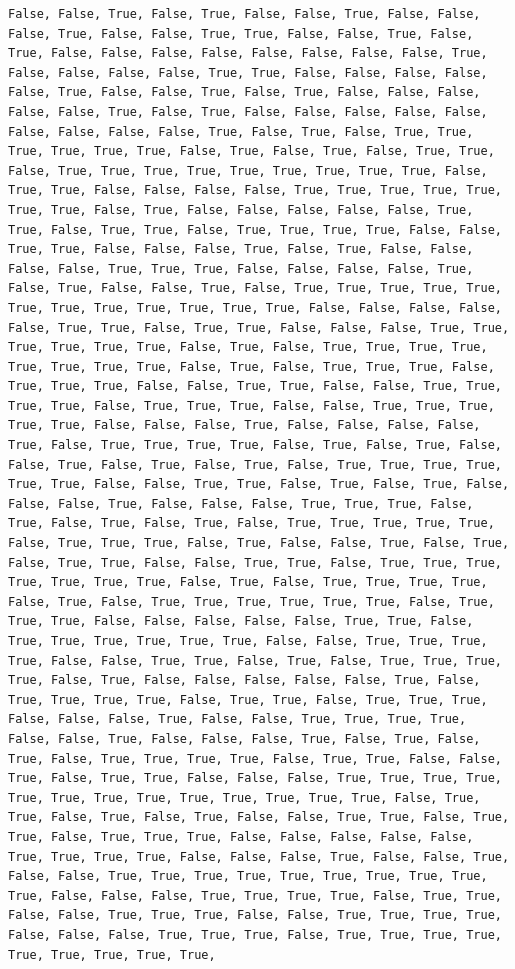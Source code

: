 \documentclass[
  letterpaper,
  DIV=11,
  numbers=noendperiod]{scrartcl}
\begin{document}
\begin{verbatim}
False, False, True, False, True, False, False, True, False, False, False, True, False, False, True, True, False, False, True, False, True, False, False, False, False, False, False, False, False, True, False, False, False, False, True, True, False, False, False, False, False, True, False, False, True, False, True, False, False, False, False, False, True, False, True, False, False, False, False, False, False, False, False, False, True, False, True, False, True, True, True, True, True, True, False, True, False, True, False, True, True, False, True, True, True, True, True, True, True, True, True, False, True, True, False, False, False, False, True, True, True, True, True, True, True, False, True, False, False, False, False, False, True, True, False, True, True, False, True, True, True, True, False, False, True, True, False, False, False, True, False, True, False, False, False, False, True, True, True, False, False, False, False, True, False, True, False, False, True, False, True, True, True, True, True, True, True, True, True, True, True, True, False, False, False, False, False, True, True, False, True, True, False, False, False, True, True, True, True, True, True, False, True, False, True, True, True, True, True, True, True, True, False, True, False, True, True, True, False, True, True, True, False, False, True, True, False, False, True, True, True, True, False, True, True, True, False, False, True, True, True, True, True, False, False, False, True, False, False, False, False, True, False, True, True, True, True, False, True, False, True, False, False, True, False, True, False, True, False, True, True, True, True, True, True, False, False, True, True, False, True, False, True, False, False, False, True, False, False, False, True, True, True, False, True, False, True, False, True, False, True, True, True, True, True, False, True, True, True, False, True, False, False, True, False, True, False, True, True, False, False, True, True, False, True, True, True, True, True, True, True, False, True, False, True, True, True, True, False, True, False, True, True, True, True, True, True, False, True, True, True, False, False, False, False, False, True, True, False, True, True, True, True, True, True, False, False, True, True, True, True, False, False, True, True, False, True, False, True, True, True, True, False, True, False, False, False, False, False, True, False, True, True, True, True, False, True, True, False, True, True, True, False, False, False, True, False, False, True, True, True, True, False, False, True, False, False, False, True, False, True, False, True, False, True, True, True, True, False, True, True, False, False, True, False, True, True, False, False, False, True, True, True, True, True, True, True, True, True, True, True, True, True, False, True, True, False, True, False, True, False, False, True, True, False, True, True, False, True, True, True, False, False, False, False, False, True, True, True, True, False, False, False, True, False, False, True, False, False, True, True, True, True, True, True, True, True, True, True, False, False, False, True, True, True, True, False, True, True, False, False, True, True, True, False, False, True, True, True, True, False, False, False, True, True, True, False, True, True, True, True, True, True, True, True, True, 
\end{verbatim}
\end{document}
